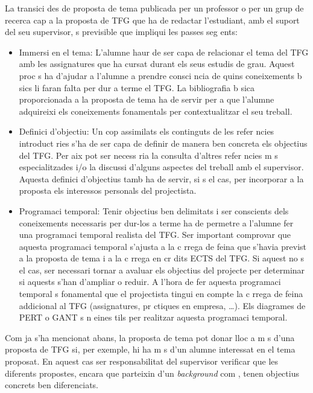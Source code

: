 La transici  des de proposta de tema publicada per un professor o per un grup de recerca cap a la proposta de \ac{TFG} que ha de redactar l'estudiant, amb el suport del seu supervisor,  s previsible que impliqui les passes seg ents:
\begin{itemize}
\item Immersi  en el tema: L'alumne haur  de ser capa  de relacionar el tema del \ac{TFG} amb les assignatures que ha cursat durant els seus estudis de grau. Aquest proc s ha d'ajudar a l'alumne a prendre consci ncia de quins coneixements b sics li faran falta per dur a terme el \ac{TFG}. La bibliografia b sica proporcionada a la proposta de tema ha de servir per a que l'alumne adquireixi els coneixements fonamentals per contextualitzar el seu treball.
\item Definici  d'objectiu: Un cop assimilats els continguts de les refer ncies introduct ries s'ha de ser capa  de definir de manera ben concreta els objectius del \ac{TFG}. Per aix  pot ser necess ria la consulta d'altres refer ncies m s especialitzades i/o la discussi  d'alguns aspectes del treball amb el supervisor. Aquesta definici  d'objectius tamb  ha de servir, si  s el cas, per incorporar a la proposta els interessos personals del projectista.
\item Programaci  temporal: Tenir objectius ben delimitats i ser conscients dels coneixements necessaris per dur-los a terme ha de permetre a l'alumne fer una programaci  temporal realista del \ac{TFG}. Ser  important comprovar que aquesta programaci  temporal s'ajusta a la c rrega de feina que s'havia previst a la proposta de tema i a la c rrega en cr dits ECTS del \ac{TFG}. Si aquest no  s el cas, ser  necessari tornar a avaluar els objectius del projecte per determinar si aquests s'han d'ampliar o reduir. A l'hora de fer aquesta programaci  temporal  s fonamental que el projectista tingui en compte la c rrega de feina addicional al \ac{TFG} (assignatures, pr ctiques en empresa, \ldots). Els diagrames de PERT o GANT s n eines  tils per realitzar aquesta programaci  temporal.
\end{itemize}
Com ja s'ha mencionat abans, la proposta de tema pot donar lloc a m s d'una proposta de \ac{TFG} si, per exemple, hi ha m s d'un alumne interessat en el tema proposat. En aquest cas ser 
responsabilitat del supervisor verificar que les diferents propostes, encara que parteixin d'un \emph{background} com , tenen objectius concrets ben diferenciats.

